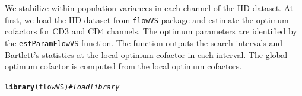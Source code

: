 \documentclass{article}\usepackage[]{graphicx}\usepackage[]{color}
\makeatletter
\newcommand{\hlcom}[1]{\textcolor[rgb]{0.678,0.584,0.686}{\textit{#1}}}%
\newcommand{\hlstd}[1]{\textcolor[rgb]{0.345,0.345,0.345}{#1}}%
\newcommand{\hlkwd}[1]{\textcolor[rgb]{0.737,0.353,0.396}{\textbf{#1}}}%
\newenvironment{kframe}{%
 \def\at@end@of@kframe{}%
 \ifinner\ifhmode%
  \def\at@end@of@kframe{\end{minipage}}%
  \begin{minipage}{\columnwidth}%
 \fi\fi%
 \def\FrameCommand##1{\hskip\@totalleftmargin \hskip-\fboxsep
 \colorbox{shadecolor}{##1}\hskip-\fboxsep
     \hskip-\linewidth \hskip-\@totalleftmargin \hskip\columnwidth}%
 \MakeFramed {\advance\hsize-\width
   \@totalleftmargin\z@ \linewidth\hsize
   \@setminipage}}%
 {\par\unskip\endMakeFramed%
 \at@end@of@kframe}
\newenvironment{knitrout}{}{} %
\newcommand{\Rpackage}[1]{{\texttt{#1}}}
\makeatother
\begin{document}
We stabilize within-population variances in each channel of the HD dataset.
At first, we load the HD dataset from \Rpackage{flowVS} package and estimate the optimum cofactors for CD3 and CD4 channels.
The optimum parameters are identified by the \texttt{estParamFlowVS} function.
The function outputs the search intervals and Bartlett's statistics at the local optimum cofactor in each interval.
The global optimum cofactor is computed from the local optimum cofactors.


\begin{knitrout}
\color{fgcolor}\begin{kframe}
\begin{alltt}
\hlkwd{library}\hlstd{(flowVS)} \hlcom{#load library}
\end{alltt}
\end{kframe}
\end{knitrout}
\end{document}
